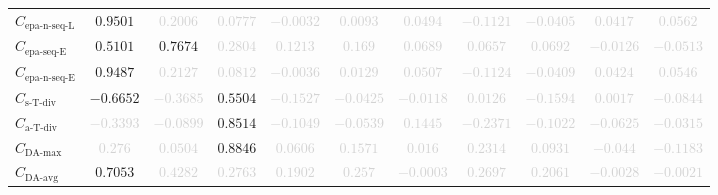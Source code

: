 \documentclass{standalone}
\newcommand{\daavgname}{\text{DA-avg}}
\newcommand{\daavg}{C_{\daavgname}}
\newcommand{\damaxname}{\text{DA-max}}
\newcommand{\damax}{C_{\damaxname}}
\newcommand{\simpletracedivname}{\text{s-T-div}}
\newcommand{\simpletracediv}{C_{\simpletracedivname}}
\newcommand{\advtracedivname}{\text{a-T-div}}
\newcommand{\advtracediv}{C_{\advtracedivname}}
\newcommand{\epanormsequencelname}{\text{epa-n-seq-L}}
\newcommand{\epanormsequencel}{C_{\epanormsequencelname}}
\newcommand{\epasequenceename}{\text{epa-seq-E}}
\newcommand{\epasequencee}{C_{\epasequenceename}}
\newcommand{\epanormsequenceename}{\text{epa-n-seq-E}}
\newcommand{\epanormsequencee}{C_{\epanormsequenceename}}
\begin{document}
\begin{tabular}{lcccccccccc}
$\epanormsequencel$ & $0.9501$ & \textcolor{lightgray}{$0.2006$} & \textcolor{lightgray}{$0.0777$} & \textcolor{lightgray}{$-0.0032$} & \textcolor{lightgray}{$0.0093$} & \textcolor{lightgray}{$0.0494$} & \textcolor{lightgray}{$-0.1121$} & \textcolor{lightgray}{$-0.0405$} & \textcolor{lightgray}{$0.0417$} & \textcolor{lightgray}{$0.0562$} \\ 
$\epasequencee$ & $0.5101$ & $0.7674$ & \textcolor{lightgray}{$0.2804$} & \textcolor{lightgray}{$0.1213$} & \textcolor{lightgray}{$0.169$} & \textcolor{lightgray}{$0.0689$} & \textcolor{lightgray}{$0.0657$} & \textcolor{lightgray}{$0.0692$} & \textcolor{lightgray}{$-0.0126$} & \textcolor{lightgray}{$-0.0513$} \\ 
$\epanormsequencee$ & $0.9487$ & \textcolor{lightgray}{$0.2127$} & \textcolor{lightgray}{$0.0812$} & \textcolor{lightgray}{$-0.0036$} & \textcolor{lightgray}{$0.0129$} & \textcolor{lightgray}{$0.0507$} & \textcolor{lightgray}{$-0.1124$} & \textcolor{lightgray}{$-0.0409$} & \textcolor{lightgray}{$0.0424$} & \textcolor{lightgray}{$0.0546$} \\ 
$\simpletracediv$ & $-0.6652$ & \textcolor{lightgray}{$-0.3685$} & $0.5504$ & \textcolor{lightgray}{$-0.1527$} & \textcolor{lightgray}{$-0.0425$} & \textcolor{lightgray}{$-0.0118$} & \textcolor{lightgray}{$0.0126$} & \textcolor{lightgray}{$-0.1594$} & \textcolor{lightgray}{$0.0017$} & \textcolor{lightgray}{$-0.0844$} \\ 
$\advtracediv$ & \textcolor{lightgray}{$-0.3393$} & \textcolor{lightgray}{$-0.0899$} & $0.8514$ & \textcolor{lightgray}{$-0.1049$} & \textcolor{lightgray}{$-0.0539$} & \textcolor{lightgray}{$0.1445$} & \textcolor{lightgray}{$-0.2371$} & \textcolor{lightgray}{$-0.1022$} & \textcolor{lightgray}{$-0.0625$} & \textcolor{lightgray}{$-0.0315$} \\ 
$\damax$ & \textcolor{lightgray}{$0.276$} & \textcolor{lightgray}{$0.0504$} & $0.8846$ & \textcolor{lightgray}{$0.0606$} & \textcolor{lightgray}{$0.1571$} & \textcolor{lightgray}{$0.016$} & \textcolor{lightgray}{$0.2314$} & \textcolor{lightgray}{$0.0931$} & \textcolor{lightgray}{$-0.044$} & \textcolor{lightgray}{$-0.1183$} \\ 
$\daavg$ & $0.7053$ & \textcolor{lightgray}{$0.4282$} & \textcolor{lightgray}{$0.2763$} & \textcolor{lightgray}{$0.1902$} & \textcolor{lightgray}{$0.257$} & \textcolor{lightgray}{$-0.0003$} & \textcolor{lightgray}{$0.2697$} & \textcolor{lightgray}{$0.2061$} & \textcolor{lightgray}{$-0.0028$} & \textcolor{lightgray}{$-0.0021$} \\ 

\end{tabular}
\end{document}
